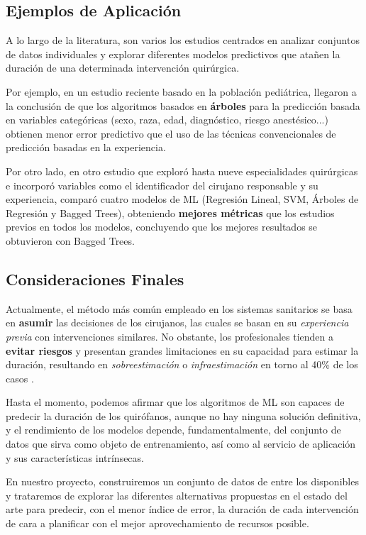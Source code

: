 \subsection{Ejemplos de Aplicación}

A lo largo de la literatura, son varios los estudios centrados en analizar conjuntos de datos individuales y explorar diferentes modelos predictivos que atañen la duración de una determinada intervención quirúrgica.

Por ejemplo, en un estudio reciente \cite{Master2017ImprovingLearning} basado en la población pediátrica, llegaron a la conclusión de que los algoritmos basados en \textbf{árboles} para la predicción basada en variables categóricas (sexo, raza, edad, diagnóstico, riesgo anestésico...) obtienen menor error predictivo que el uso de las técnicas convencionales de predicción basadas en la experiencia.

Por otro lado, en otro estudio que exploró hasta nueve especialidades quirúrgicas \cite{Martinez2021MachinePrediction} e incorporó variables como el identificador del cirujano responsable y su experiencia, comparó cuatro modelos de ML (Regresión Lineal, SVM, Árboles de Regresión y Bagged Trees), obteniendo \textbf{mejores métricas} que los estudios previos en todos los modelos, concluyendo que los mejores resultados se obtuvieron con Bagged Trees.

\subsection{Consideraciones Finales}

Actualmente, el método más común empleado en los sistemas sanitarios se basa en \textbf{asumir} las decisiones de los cirujanos, las cuales se basan en su \textit{experiencia previa} con intervenciones similares. No obstante, los profesionales tienden a \textbf{evitar riesgos} y presentan grandes limitaciones en su capacidad para estimar la duración, resultando en \textit{sobreestimación} o \textit{infraestimación} en torno al 40\% de los casos \cite{Huang2022AutomaticNetworks}.

Hasta el momento, podemos afirmar que los algoritmos de ML son capaces de predecir la duración de los quirófanos, aunque no hay ninguna solución definitiva, y el rendimiento de los modelos depende, fundamentalmente, del conjunto de datos que sirva como objeto de entrenamiento, así como al servicio de aplicación y sus características intrínsecas.

En nuestro proyecto, construiremos un conjunto de datos de entre los disponibles y trataremos de explorar las diferentes alternativas propuestas en el estado del arte para predecir, con el menor índice de error, la duración de cada intervención de cara a planificar con el mejor aprovechamiento de recursos posible.

